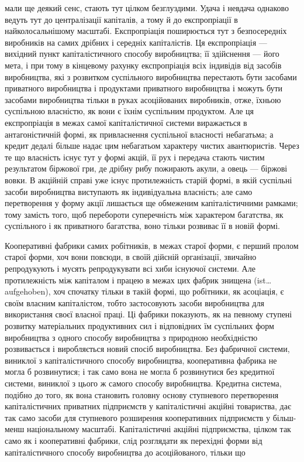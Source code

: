 \parcont{}  %
мали ще деякий сенс, стають тут цілком безглуздими. Удача
і невдача однаково ведуть тут до централізації капіталів,
а тому й до експропріації в найколосальнішому масштабі. Експропріація поширюється тут з
безпосередніх виробників на
самих дрібних і середніх капіталістів. Ця експропріація — вихідний пункт капіталістичного способу
виробництва; її здійснення — його мета, і при тому в кінцевому рахунку експропріація всіх індивідів
від засобів виробництва, які з розвитком
суспільного виробництва перестають бути засобами приватного
виробництва і продуктами приватного виробництва і можуть
бути засобами виробництва тільки в руках асоційованих виробників, отже, їхньою суспільною власністю,
як вони є їхнім суспільним
продуктом. Але ця експропріація в межах самої капіталістичної
системи виражається в антагоністичній формі, як привласнення
суспільної власності небагатьма; а кредит дедалі більше надає
цим небагатьом характеру чистих авантюристів. Через те що
власність існує тут у формі акцій, її рух і передача стають
чистим результатом біржової гри, де дрібну рибу пожирають
акули, а овець — біржові вовки. В акційній справі уже існує
протилежність старій формі, в якій суспільні засоби виробництва
виступають як індивідуальна власність; але само перетворення
у форму акції лишається ще обмеженим капіталістичними рамками; тому замість того, щоб перебороти
суперечність між
характером багатства, як суспільного і як приватного багатства, воно тільки розвиває її в новій
формі.

Кооперативні фабрики самих робітників, в межах старої
форми, є перший пролом старої форми, хоч вони повсюди,
в своїй дійсній організації, звичайно репродукують і мусять
репродукувати всі хиби існуючої системи. Але протилежність між
капіталом і працею в межах цих фабрик знищена (ist\dots{} aufgehoben),
хоч спочатку тільки в такій формі, що робітники, як асоціація,
є своїм власним капіталістом, тобто застосовують засоби виробництва для використання своєї власної
праці. Ці фабрики показують, як на певному ступені розвитку матеріальних продуктивних сил і
відповідних їм суспільних форм виробництва з одного
способу виробництва з природною необхідністю розвивається і
виробляється новий спосіб виробництва. Без фабричної системи,
виниклої з капіталістичного способу виробництва, кооперативна фабрика не могла б розвинутися; і так
само вона не могла б
розвинутися без кредитної системи, виниклої з цього ж самого
способу виробництва. Кредитна система, подібно до того, як
вона становить головну основу ступневого перетворення капіталістичних приватних підприємств у
капіталістичні акційні товариства, дає так само засоби для ступневого розширення кооперативних
підприємств у більш-менш національному масштабі.
Капіталістичні акційні підприємства, цілком так само як і кооперативні фабрики, слід розглядати як
перехідні форми від капіталістичного способу виробництва до асоційованого, тільки що
\parbreak{}  %
